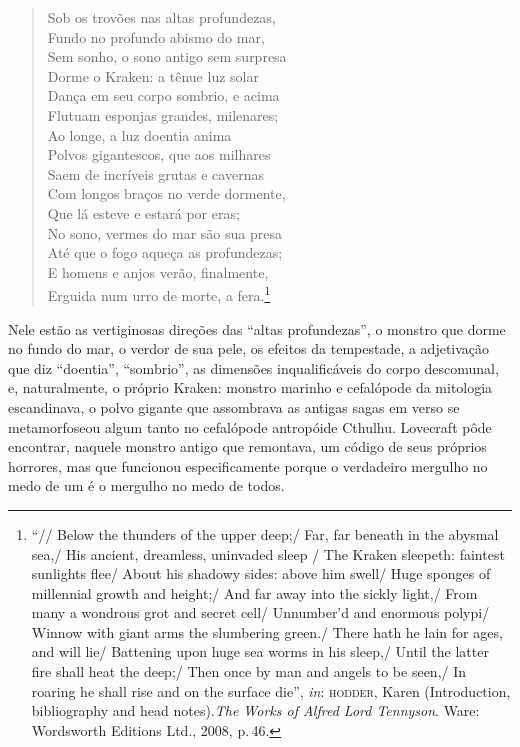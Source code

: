 \begin{verse}
Sob os trovões nas altas profundezas,\\
Fundo no profundo abismo do mar,\\
Sem sonho, o sono antigo sem surpresa\\
Dorme o Kraken: a tênue luz solar\\
Dança em seu corpo sombrio, e acima\\
Flutuam esponjas grandes, milenares;\\
Ao longe, a luz doentia anima\\
Polvos gigantescos, que aos milhares\\
Saem de incríveis grutas e cavernas\\
Com longos braços no verde dormente,\\
Que lá esteve e estará por eras;\\
No sono, vermes do mar são sua presa\\
Até que o fogo aqueça as profundezas;\\
E homens e anjos verão, finalmente,\\
Erguida num urro de morte, a fera.\footnote{``// Below the
  thunders of the upper deep;/ Far, far beneath in the abysmal sea,/ His
  ancient, dreamless, uninvaded sleep / The Kraken sleepeth: faintest
  sunlights flee/ About his shadowy sides: above him swell/ Huge sponges
  of millennial growth and height;/ And far away into the sickly
  light,/ From many a wondrous grot and secret cell/ Unnumber'd and
  enormous polypi/ Winnow with giant arms the slumbering green./ There
  hath he lain for ages, and will lie/ Battening upon huge sea worms in
  his sleep,/ Until the latter fire shall heat the deep;/ Then once by man
  and angels to be seen,/ In roaring he shall rise and on the surface
  die'', \emph{in}: \textsc{hodder}, Karen (Introduction, bibliography and head
  notes).\emph{The Works of Alfred Lord Tennyson}. Ware: Wordsworth
  Editions Ltd., 2008, p.\,46.}
\end{verse}

Nele estão as vertiginosas direções das ``altas profundezas'', o monstro
que dorme no fundo do mar, o verdor de sua pele, os efeitos da
tempestade, a adjetivação que diz ``doentia'', ``sombrio'', as dimensões
inqualificáveis do corpo descomunal, e, naturalmente, o próprio Kraken:
monstro marinho e cefalópode da mitologia escandinava, o polvo gigante
que assombrava as antigas sagas em verso se metamorfoseou algum tanto no
cefalópode antropóide Cthulhu. Lovecraft pôde encontrar, naquele monstro
antigo que remontava, um código de seus próprios horrores, mas que
funcionou especificamente porque o verdadeiro mergulho no medo de um é o
mergulho no medo de todos.

